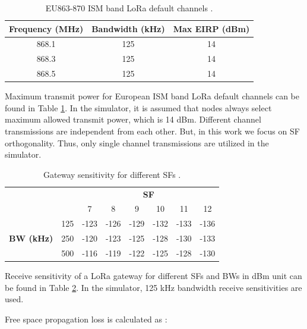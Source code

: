 \documentclass[conference]{IEEEtran}
\begin{document}
\begin{table}
\centering
\caption{EU863-870 ISM band LoRa default channels \cite{lorawan.regional.parameters}.}
\label{table:max_tx_power}
\begin{tabular}{|c|c|c|}
\hline
\textbf{Frequency (MHz)} & \textbf{Bandwidth (kHz)} & \textbf{Max EIRP (dBm)} \\ \hline
      868.1 &   125 &   14 \\ \hline
      868.3 &   125 &   14 \\ \hline
      868.5 &   125 &   14 \\ \hline
\end{tabular}
\end{table}

Maximum transmit power for European ISM band LoRa default channels can be found in Table \ref{table:max_tx_power}. In the simulator, it is assumed that nodes always select maximum allowed transmit power, which is 14 dBm. Different channel transmissions are independent from each other. But, in this work we focus on SF orthogonality. Thus, only single channel transmissions are utilized in the simulator.

\begin{table}
\centering
\caption{Gateway sensitivity for different SFs \cite{SX1276}.}
\label{table:gw_sf_sensitivity}
\begin{tabular}{|c|c|c|c|c|c|c|c|}
\hline
\multicolumn{2}{|c|}{\multirow{2}{*}{}} & \multicolumn{6}{c|}{\textbf{SF}} \\ \cline{3-8}
\multicolumn{2}{|c|}{}                  &    7 &    8 &    9 &   10 &   11 &   12 \\ \hline
\multirow{3}{*}{\textbf{BW (kHz)}}  & 125 & -123 & -126 & -129 & -132 & -133 & -136 \\ \cline{2-8}
                                    & 250 & -120 & -123 & -125 & -128 & -130 & -133 \\ \cline{2-8}
                                    & 500 & -116 & -119 & -122 & -125 & -128 & -130 \\ \hline
\end{tabular}
\end{table}

Receive sensitivity of a LoRa gateway for different SFs and BWs in dBm unit can be found in Table \ref{table:gw_sf_sensitivity}. In the simulator, 125 kHz bandwidth receive sensitivities are used.

Free space propagation loss is calculated as \cite{TR136.942}:
\end{document}
